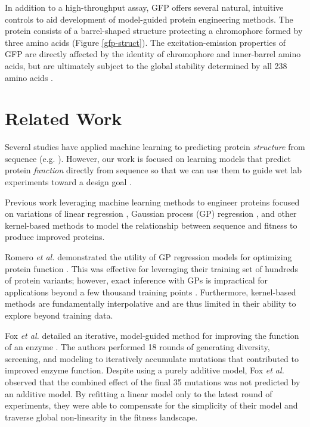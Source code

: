 In addition to a high-throughput assay, GFP offers several natural, intuitive controls to aid development of model-guided protein engineering methods. The protein consists of a barrel-shaped structure protecting a chromophore formed by three amino acids (Figure \ref{gfp-struct}). The excitation-emission properties of GFP are directly affected by the identity of chromophore and inner-barrel amino acids, but are ultimately subject to the global stability determined by all 238 amino acids \cite{Dedecker2013-hv}.


\section{Related Work}

Several studies have applied machine learning to predicting protein \textit{structure} from sequence (e.g. \cite{golkov2016protein, alquraishi2018end}). However, our work is focused on learning models that predict protein \textit{function} directly from sequence so that we can use them to guide wet lab experiments toward a design goal \cite{cohn1996active}.

Previous work leveraging machine learning methods to engineer proteins focused on variations of linear regression \cite{Liao2007-jn,Fox2007-ur}, Gaussian process (GP) regression \cite{Romero2013-ac,Bedbrook2017-ed}, and other kernel-based methods to model the relationship between sequence and fitness to produce improved proteins.

Romero \emph{et al.} demonstrated the utility of GP regression models for optimizing protein function \cite{Romero2013-ac}. This was effective for leveraging their training set of hundreds of protein variants; however, exact inference with GPs is impractical for applications beyond a few thousand training points \cite{Gilboa2013-yt}. Furthermore, kernel-based methods are fundamentally interpolative and are thus limited in their ability to explore beyond training data.

Fox \emph{et al.} detailed an iterative, model-guided method for improving the function of an enzyme \cite{Fox2007-ur}. The authors performed 18 rounds of generating diversity, screening, and modeling to iteratively accumulate mutations that contributed to improved enzyme function. Despite using a purely additive model, Fox \emph{et al.} observed that the combined effect of the final 35 mutations was not predicted by an additive model. By refitting a linear model only to the latest round of experiments, they were able to compensate for the simplicity of their model and traverse global non-linearity in the fitness landscape.  

